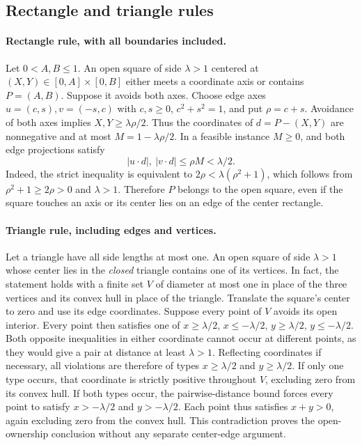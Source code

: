 \documentclass[11pt]{article}
\begin{document}
\subsection{Rectangle and triangle rules}
\paragraph{Rectangle rule, with all boundaries included.}
Let $0<A,B\le1$. An open square of side $\lambda>1$ centered at
$(X,Y)\in[0,A]\times[0,B]$ either meets a coordinate axis or contains
$P=(A,B)$. Suppose it avoids both axes. Choose edge axes
$u=(c,s),v=(-s,c)$ with $c,s\ge0$, $c^2+s^2=1$, and put $\rho=c+s$.
Avoidance of both axes implies $X,Y\ge\lambda\rho/2$. Thus the
coordinates of $d=P-(X,Y)$ are nonnegative and at most
$M=1-\lambda\rho/2$. In a feasible instance $M\ge0$, and both edge
projections satisfy
\[
 |u\cdot d|,\ |v\cdot d|\le\rho M<\lambda/2.
\]
Indeed, the strict inequality is equivalent to
$2\rho<\lambda(\rho^2+1)$, which follows from
$\rho^2+1\ge2\rho>0$ and $\lambda>1$. Therefore $P$ belongs to the
open square, even if the square touches an axis or its center lies on
an edge of the center rectangle.

\paragraph{Triangle rule, including edges and vertices.}
Let a triangle have all side lengths at most one. An open square of
side $\lambda>1$ whose center lies in the \emph{closed} triangle
contains one of its vertices. In fact, the statement holds with a finite
set $V$ of diameter at most one in place of the three vertices and its
convex hull in place of the triangle.
Translate the square's center to zero and use its edge coordinates.
Suppose every point of $V$ avoids its open interior. Every point then
satisfies one of $x\ge\lambda/2$, $x\le-\lambda/2$,
$y\ge\lambda/2$, $y\le-\lambda/2$. Both opposite inequalities in either
coordinate cannot occur at different points, as they would give a pair
at distance at least $\lambda>1$. Reflecting coordinates if necessary,
all violations are therefore of types $x\ge\lambda/2$ and
$y\ge\lambda/2$.
If only one type occurs, that coordinate is strictly positive throughout
$V$, excluding zero from its convex hull. If both types occur, the
pairwise-distance bound forces every point to satisfy
$x> -\lambda/2$ and $y> -\lambda/2$. Each point thus satisfies $x+y>0$,
again excluding zero from the convex hull. This contradiction proves the
open-ownership conclusion without any separate center-edge argument.
\end{document}
